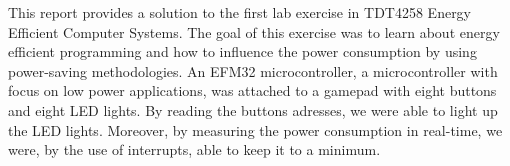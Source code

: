 This report provides a solution to the first lab exercise in TDT4258 Energy Efficient Computer Systems. The goal of this exercise was to learn about energy efficient programming and how to influence the power consumption by using power-saving methodologies. An EFM32 microcontroller, a microcontroller with focus on low power applications, was attached to a gamepad with eight buttons and eight LED lights. By reading the buttons adresses, we were able to light up the LED lights. Moreover, by measuring the power consumption in real-time, we were, by the use of interrupts, able to keep it to a minimum.
